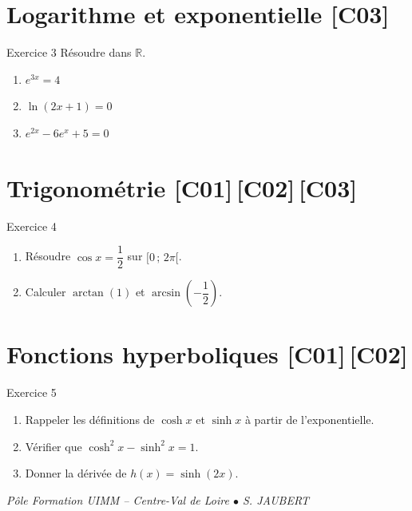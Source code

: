 \documentclass[a4paper,11pt]{article}
\begin{document}
\section{Logarithme et exponentielle \hfill {\normalsize\color{uimmred}[C03]}}
\begin{exo}{Exercice 3}
Résoudre dans $\mathbb{R}$.
\begin{enumerate}[label=\alph*)]
  \item $e^{3x} = 4$
  \item $\ln(2x + 1) = 0$
  \item $e^{2x} - 6e^x + 5 = 0$
\end{enumerate}
\end{exo}

\section{Trigonométrie \hfill {\normalsize\color{uimmred}[C01]\,[C02]\,[C03]}}
\begin{exo}{Exercice 4}
\begin{enumerate}[label=\alph*)]
  \item Résoudre $\cos x = \dfrac{1}{2}$ sur $[0\,;\,2\pi[$.
  \item Calculer $\arctan(1)$ et $\arcsin\!\left(-\dfrac{1}{2}\right)$.
\end{enumerate}
\end{exo}

\section{Fonctions hyperboliques \hfill {\normalsize\color{uimmred}[C01]\,[C02]}}
\begin{exo}{Exercice 5}
\begin{enumerate}[label=\alph*)]
  \item Rappeler les définitions de $\cosh x$ et $\sinh x$ à partir de l'exponentielle.
  \item Vérifier que $\cosh^2 x - \sinh^2 x = 1$.
  \item Donner la dérivée de $h(x) = \sinh(2x)$.
\end{enumerate}
\end{exo}

\vfill
\begin{center}\color{uimmgray}\small
\textit{Pôle Formation UIMM -- Centre-Val de Loire $\bullet$ S. JAUBERT}
\end{center}
\end{document}
